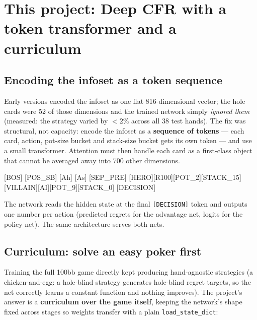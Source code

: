 \documentclass[11pt,a4paper]{article}
\begin{document}
\section{This project: Deep CFR with a token transformer and a curriculum}
\label{sec:project}

\subsection{Encoding the infoset as a token sequence}

Early versions encoded the infoset as one flat 816-dimensional vector; the
hole cards were 52 of those dimensions and the trained network simply
\emph{ignored them} (measured: the strategy varied by $<2\%$ across all 38
test hands). The fix was structural, not capacity: encode the infoset as a
\textbf{sequence of tokens} --- each card, action, pot-size bucket and
stack-size bucket gets its own token --- and use a small transformer.
Attention must then handle each card as a first-class object that cannot be
averaged away into 700 other dimensions.

\begin{center}
\ttfamily\small
[BOS] [POS\_SB] [Ah] [As] [SEP\_PRE] [HERO][R100][POT\_2][STACK\_15] \\
\hphantom{[BOS] }[VILLAIN][AI][POT\_9][STACK\_0] [DECISION]
\end{center}

The network reads the hidden state at the final \texttt{[DECISION]} token and
outputs one number per action (predicted regrets for the advantage net,
logits for the policy net). The same architecture serves both nets.

\subsection{Curriculum: solve an easy poker first}

Training the full 100bb game directly kept producing hand-agnostic strategies
(a chicken-and-egg: a hole-blind strategy generates hole-blind regret targets,
so the net correctly learns a constant function and nothing improves).
The project's answer is a \textbf{curriculum over the game itself}, keeping the
network's shape fixed across stages so weights transfer with a plain
\texttt{load\_state\_dict}:
\end{document}
